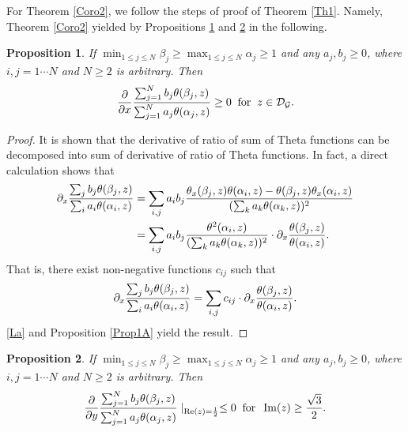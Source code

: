 \documentclass[reqno,english]{amsart}
\newtheorem{proposition}{Proposition}[section]
\newtheorem{open problem}{Open Problem}[section]
\newtheorem{open question}{Open Question}[section]
\newtheorem{open questions on hexagonal lattice}{Open Questions on hexagonal lattice}[section]
\renewcommand{\Re}{\operatorname{Re}}
\renewcommand{\Im}{\operatorname{Im}}
\begin{document}
For Theorem \ref{Coro2}, we follow the steps of proof of Theorem \ref{Th1}. Namely, Theorem \ref{Coro2}
 yielded by Propositions \ref{Prop2.3} and \ref{Prop2.4} in the following.
\begin{proposition}\label{Prop2.3} If $\min_{1\leq j\leq N}\beta_j\geq\max_{1\leq j\leq N}\alpha_j\geq1$ and any $a_j, b_j\geq0$, where $i,j=1\cdots N$ and $N\geq2$ is arbitrary. Then
\begin{equation}\aligned\nonumber
\frac{\partial}{\partial x}\frac{\sum_{j=1}^Nb_j\theta(\beta_j,z)}{\sum_{j=1}^Na_j\theta(\alpha_j,z)}\geq0\;\;\hbox{for}\;\;z\in\mathcal{D}_{\mathcal{G}}.
\endaligned\end{equation}

\end{proposition}

\begin{proof}
It is shown that the derivative of ratio of sum of Theta functions can be decomposed into sum of derivative of ratio of Theta functions. In fact, a direct calculation shows that
\begin{equation}\aligned\nonumber
\partial_x\frac{\sum_{j}b_j\theta(\beta_j,z)}{\sum_{i}a_i\theta(\alpha_i,z)}
&=\sum_{i,j}a_ib_j\frac{
\theta_x(\beta_j,z)\theta(\alpha_i,z)-\theta(\beta_j,z)\theta_x(\alpha_i,z)
}{(\sum_k a_k\theta(\alpha_k,z))^2}
\\
&=\sum_{i,j}a_ib_j\frac{\theta^2(\alpha_i,z)}{(\sum_k a_k\theta(\alpha_k,z))^2}\cdot \partial_x\frac{\theta(\beta_j,z)}{\theta(\alpha_i,z)}.
\endaligned\end{equation}
That is, there exist non-negative functions $c_{ij}$ such that
\begin{equation}\aligned\label{La}
\partial_x\frac{\sum_{j}b_j\theta(\beta_j,z)}{\sum_{i}a_i\theta(\alpha_i,z)}
=\sum_{i,j}c_{ij} \cdot\partial_x\frac{\theta(\beta_j,z)}{\theta(\alpha_i,z)}.
\endaligned\end{equation}
\eqref{La} and Proposition \ref{Prop1A} yield the result.

\end{proof}


\begin{proposition}\label{Prop2.4} If $\min_{1\leq j\leq N}\beta_j\geq\max_{1\leq j\leq N}\alpha_j\geq1$ and any $a_j, b_j\geq0$, where $i,j=1\cdots N$ and $N\geq2$ is arbitrary. Then
\begin{equation}\aligned\nonumber
\frac{\partial}{\partial y}\frac{\sum_{j=1}^Nb_j\theta(\beta_j,z)}{\sum_{j=1}^Na_j\theta(\alpha_j,z)}\mid_{\Re(z)=\frac{1}{2}}\leq0\;\;\hbox{for}\;\;\Im(z)\geq\frac{\sqrt3}{2}.
\endaligned\end{equation}

\end{proposition}
\end{document}
